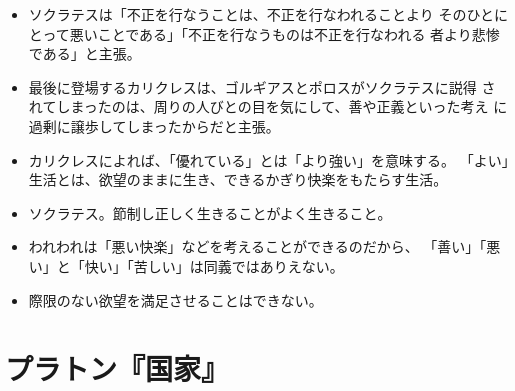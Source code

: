 \documentclass{jsarticle}
\begin{document}
\begin{itemize}
\item ソクラテスは「不正を行なうことは、不正を行なわれることより
  そのひとにとって悪いことである」「不正を行なうものは不正を行なわれる
  者より悲惨である」と主張。



\item 最後に登場するカリクレスは、ゴルギアスとポロスがソクラテスに説得
  されてしまったのは、周りの人びとの目を気にして、善や正義といった考え
  に過剰に譲歩してしまったからだと主張。

\item カリクレスによれば、「優れている」とは「より強い」を意味する。
  「よい」生活とは、欲望のままに生き、できるかぎり快楽をもたらす生活。

\item ソクラテス。節制し正しく生きることがよく生きること。

\item われわれは「悪い快楽」などを考えることができるのだから、
「善い」「悪い」と「快い」「苦しい」は同義ではありえない。

\item 際限のない欲望を満足させることはできない。


\end{itemize}



\section{プラトン『国家』}
\end{document}
